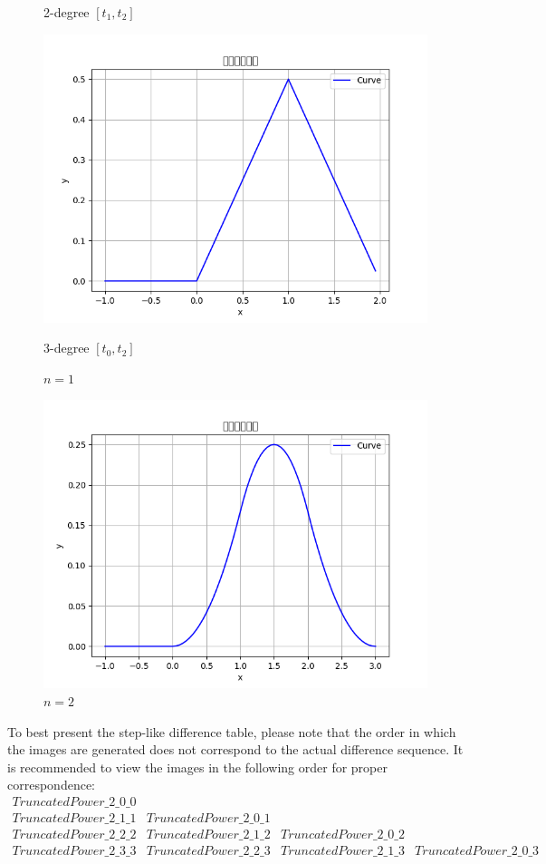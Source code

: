 \documentclass[a4paper]{article}
\begin{document}
\begin{figure}[h]
\begin{minipage}{0.3\textwidth}
        \caption{2-degree \([t_1,t_2]\)}
        \label{fig:image2}
    \end{minipage}
    \hfill
    \begin{minipage}{0.3\textwidth}
        \centering
        \includegraphics[width=\linewidth]{../figure/n1_3.png} 
        \caption{3-degree \([t_0,t_2]\)}
        \label{fig:image3}
    \end{minipage}
    \caption{\(n=1\)}
    \label{fig:comparison}
\end{figure}

\begin{figure}[h]
    \centering
    \includegraphics[width=0.6\linewidth]{../figure/n2.png}
    \caption{\(n=2\)}
\end{figure}

To best present the step-like difference table, please note that the order in which the images are generated does not correspond to the actual difference sequence. It is recommended to view the images in the following order for proper correspondence:
\[
\begin{array}{cccc}
     TruncatedPower\_2\_0\_0  \\
     TruncatedPower\_2\_1\_1&TruncatedPower\_2\_0\_1\\
TruncatedPower\_2\_2\_2&TruncatedPower\_2\_1\_2&TruncatedPower\_2\_0\_2\\
TruncatedPower\_2\_3\_3&TruncatedPower\_2\_2\_3&TruncatedPower\_2\_1\_3&TruncatedPower\_2\_0\_3
\end{array}
\]
\end{document}
